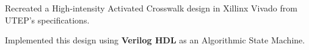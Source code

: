 \documentclass[letterpaper,10pt]{article}
\begin{document}

  \vspace{0pt}
  \begin{resume_list}
    \item Recreated a High-intensity Activated Crosswalk design in Xillinx Vivado from UTEP's specifications.
    \vspace{1pt}
    \item Implemented this design using \textbf{Verilog HDL} as an Algorithmic State Machine.
  \end{resume_list}
\end{document}
